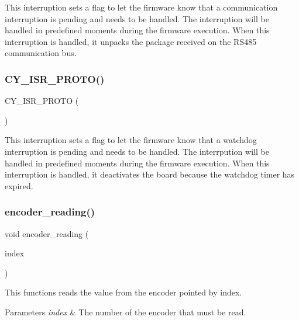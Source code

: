 This interruption sets a flag to let the firmware know that a communication interruption is pending and needs to be handled. The interruption will be handled in predefined moments during the firmware execution. When this interruption is handled, it unpacks the package received on the R\+S485 communication bus. \mbox{\label{interruptions_8h_a212cae8995d67d612c236fb54a4d29dc}} 
\subsubsection{C\+Y\+\_\+\+I\+S\+R\+\_\+\+P\+R\+O\+T\+O()\hspace{0.1cm}{\footnotesize\ttfamily [2/2]}}
{\footnotesize\ttfamily C\+Y\+\_\+\+I\+S\+R\+\_\+\+P\+R\+O\+TO (\begin{DoxyParamCaption}\item[{I\+S\+R\+\_\+\+W\+A\+T\+C\+H\+D\+O\+G\+\_\+\+Handler}]{ }\end{DoxyParamCaption})}

This interruption sets a flag to let the firmware know that a watchdog interruption is pending and needs to be handled. The interrpution will be handled in predefined moments during the firmware execution. When this interruption is handled, it deactivates the board because the watchdog timer has expired. \mbox{\label{interruptions_8h_a02aa2fd33f7b2f645490b9c7642084d7}} 
\subsubsection{encoder\+\_\+reading()}
{\footnotesize\ttfamily void encoder\+\_\+reading (\begin{DoxyParamCaption}\item[{const uint8}]{index }\end{DoxyParamCaption})}

This functions reads the value from the encoder pointed by index.


\begin{DoxyParams}{Parameters}
{\em index} & The number of the encoder that must be read. \\
\hline
\end{DoxyParams}
\mbox{\label{interruptions_8h_a39df971c4e9f194be50c54dfd7aeabfe}} 
